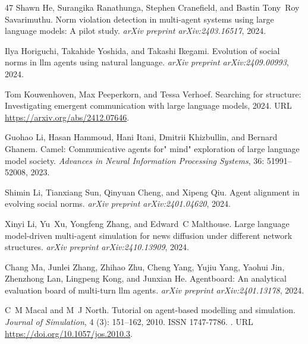 \begin{thebibliography}{47}
Shawn He, Surangika Ranathunga, Stephen Cranefield, and Bastin Tony~Roy Savarimuthu.
\newblock Norm violation detection in multi-agent systems using large language models: A pilot study.
\newblock \emph{arXiv preprint arXiv:2403.16517}, 2024.

Ilya Horiguchi, Takahide Yoshida, and Takashi Ikegami.
\newblock Evolution of social norms in llm agents using natural language.
\newblock \emph{arXiv preprint arXiv:2409.00993}, 2024.

Tom Kouwenhoven, Max Peeperkorn, and Tessa Verhoef.
\newblock Searching for structure: Investigating emergent communication with large language models, 2024.
\newblock URL \url{https://arxiv.org/abs/2412.07646}.

Guohao Li, Hasan Hammoud, Hani Itani, Dmitrii Khizbullin, and Bernard Ghanem.
\newblock Camel: Communicative agents for" mind" exploration of large language model society.
\newblock \emph{Advances in Neural Information Processing Systems}, 36: 51991--52008, 2023.

Shimin Li, Tianxiang Sun, Qinyuan Cheng, and Xipeng Qiu.
\newblock Agent alignment in evolving social norms.
\newblock \emph{arXiv preprint arXiv:2401.04620}, 2024{}.

Xinyi Li, Yu~Xu, Yongfeng Zhang, and Edward~C Malthouse.
\newblock Large language model-driven multi-agent simulation for news diffusion under different network structures.
\newblock \emph{arXiv preprint arXiv:2410.13909}, 2024{}.

Chang Ma, Junlei Zhang, Zhihao Zhu, Cheng Yang, Yujiu Yang, Yaohui Jin, Zhenzhong Lan, Lingpeng Kong, and Junxian He.
\newblock Agentboard: An analytical evaluation board of multi-turn llm agents.
\newblock \emph{arXiv preprint arXiv:2401.13178}, 2024.

C~M Macal and M~J North.
\newblock Tutorial on agent-based modelling and simulation.
\newblock \emph{Journal of Simulation}, 4 (3): 151--162, 2010.
\newblock ISSN 1747-7786.
\newblock {}.
\newblock URL \url{https://doi.org/10.1057/jos.2010.3}.


\end{thebibliography}
